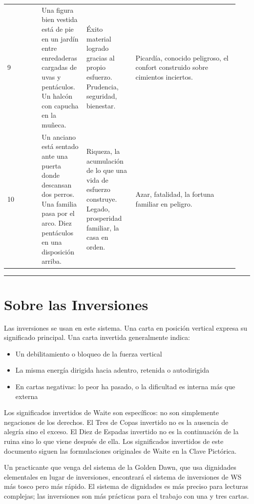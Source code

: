 \begin{longtable}[]{@{}>{\RaggedRight\small}p{0.14\linewidth}>{\RaggedRight\small}p{0.18\linewidth}>{\RaggedRight\small}p{0.20\linewidth}>{\RaggedRight\small}p{0.42\linewidth}@{}}
9 & Una figura bien vestida está de pie en un jardín entre enredaderas cargadas de uvas y pentáculos. Un halcón con capucha en la muñeca. & Éxito material logrado gracias al propio esfuerzo. Prudencia, seguridad, bienestar. & Picardía, conocido peligroso, el confort construido sobre cimientos inciertos. \\
10 & Un anciano está sentado ante una puerta donde descansan dos perros. Una familia pasa por el arco. Diez pentáculos en una disposición arriba. & Riqueza, la acumulación de lo que una vida de esfuerzo construye. Legado, prosperidad familiar, la casa en orden. & Azar, fatalidad, la fortuna familiar en peligro. \\
\end{longtable}

\begin{center}\rule{0.5\linewidth}{0.5pt}\end{center}

\section{Sobre las Inversiones}\label{on-reversals}

Las inversiones se usan en este sistema. Una carta en posición vertical expresa su significado principal. Una carta invertida generalmente indica:

\begin{itemize}
\tightlist
\item
  Un debilitamiento o bloqueo de la fuerza vertical
\item
  La misma energía dirigida hacia adentro, retenida o autodirigida
\item
  En cartas negativas: lo peor ha pasado, o la dificultad es interna más que externa
\end{itemize}

Los significados invertidos de Waite son específicos: no son simplemente negaciones de los derechos. El Tres de Copas invertido no es la ausencia de alegría sino el exceso. El Diez de Espadas invertido no es la continuación de la ruina sino lo que viene después de ella. Los significados invertidos de este documento siguen las formulaciones originales de Waite en la Clave Pictórica.

Un practicante que venga del sistema de la Golden Dawn, que usa dignidades elementales en lugar de inversiones, encontrará el sistema de inversiones de WS más tosco pero más rápido. El sistema de dignidades es más preciso para lecturas complejas; las inversiones son más prácticas para el trabajo con una y tres cartas.


